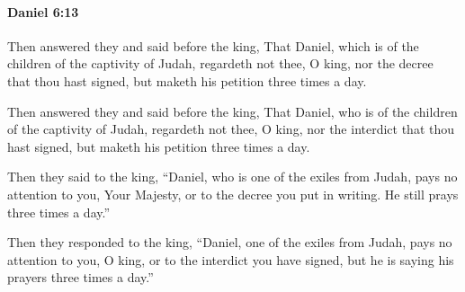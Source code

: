 		\paragraph{Daniel 6:13} %
			\label{DANIEL-6-13}

			Then answered they and said before the king, That Daniel, which is of the children of the captivity of Judah, regardeth not thee, O king, nor the decree that thou hast signed, but maketh his petition three times a day.

			\begin{versebox}
					\item[BHS] 
					\item[LXX] 
					\item[ASV] Then answered they and said before the king, That Daniel, who is of the children of the captivity of Judah, regardeth not thee, O king, nor the interdict that thou hast signed, but maketh his petition three times a day.
					\item[NIV] Then they said to the king, “Daniel, who is one of the exiles from Judah, pays no attention to you, Your Majesty, or to the decree you put in writing. He still prays three times a day.”
					\item[NRSV] Then they responded to the king, “Daniel, one of the exiles from Judah, pays no attention to you, O king, or to the interdict you have signed, but he is saying his prayers three times a day.”
			\end{versebox}

